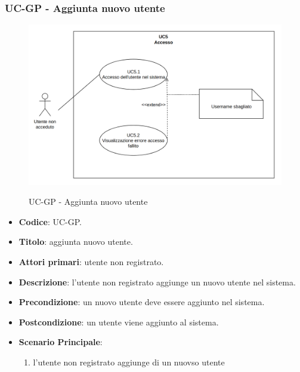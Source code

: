 \subsubsection{UC\theuccount-GP - Aggiunta nuovo utente}
		\begin{figure}[H]
			\centering
				\includegraphics[width=\columnwidth]{img/UC5.png}\\
			\caption{UC\theuccount-GP - Aggiunta nuovo utente}
		\end{figure}
	\begin{itemize}
		\item \textbf{Codice}: UC\theuccount-GP.
		\item \textbf{Titolo}: aggiunta nuovo utente.
		\item \textbf{Attori primari}: utente non registrato.
		\item \textbf{Descrizione}: l'utente non registrato aggiunge un nuovo utente nel sistema.
		\item \textbf{Precondizione}: un nuovo utente deve essere aggiunto nel sistema.
		\item \textbf{Postcondizione}: un utente viene aggiunto al sistema.
		\item \textbf{Scenario Principale}:
		\begin{enumerate}
			\item l'utente non registrato aggiunge di un nuovso utente
		\end{enumerate}
	\end{itemize}
	
